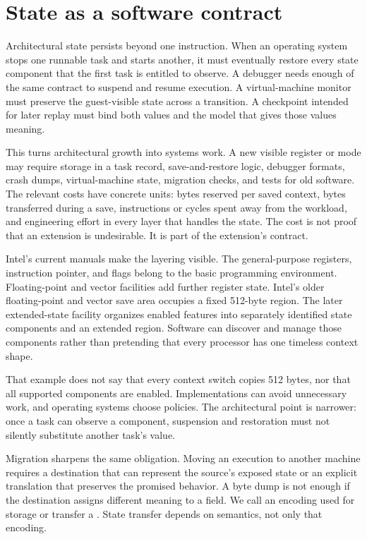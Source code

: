 \section{State as a software contract}

Architectural state persists beyond one instruction. When an operating system
stops one runnable task and starts another, it must eventually restore every
state component that the first task is entitled to observe. A debugger needs
enough of the same contract to suspend and resume execution. A virtual-machine
monitor must preserve the guest-visible state across a transition. A
checkpoint intended for later replay must bind both values and the model that
gives those values meaning.

This turns architectural growth into systems work. A new visible register or
mode may require storage in a task record, save-and-restore logic, debugger
formats, crash dumps, virtual-machine state, migration checks, and tests for
old software. The relevant costs have concrete units: bytes reserved per
saved context, bytes transferred during a save, instructions or cycles spent
away from the workload, and engineering effort in every layer that handles
the state. The cost is not proof that an extension is undesirable. It is part
of the extension's contract.

Intel's current manuals make the layering visible. The general-purpose
registers, instruction pointer, and flags belong to the basic programming
environment. Floating-point and vector facilities add further register state.
Intel's older floating-point and vector save area occupies a fixed 512-byte
region. The later extended-state facility organizes enabled features into
separately identified state components and an extended region. Software can
discover and manage those components rather than pretending that every
processor has one timeless context shape.\autocite{intel2026sdm1}

That example does not say that every context switch copies 512 bytes, nor that
all supported components are enabled. Implementations can avoid unnecessary
work, and operating systems choose policies. The architectural point is
narrower: once a task can observe a component, suspension and restoration
must not silently substitute another task's value.

Migration sharpens the same obligation. Moving an execution to another
machine requires a destination that can represent the source's exposed state
or an explicit translation that preserves the promised behavior. A byte dump
is not enough if the destination assigns different meaning to a field.
We call an encoding used for storage or transfer a .
State transfer depends on semantics, not only that encoding.

